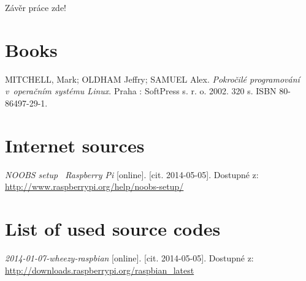 \documentclass[a4paper, twoside, 12pt]{report}
\begin{document}
Závěr práce zde!



\newpage

\fancyhead{}
\fancyhead[RO,LE]{\leftmark}
\begin{thebibliography}{}
\thispagestyle{fancy}


\section*{Books}

  	MITCHELL, Mark; OLDHAM Jeffry; SAMUEL Alex. 
  	\emph{Pokročilé programování v~operačním systému Linux}. 
  	Praha : SoftPress s. r. o. 
  	2002. 
  	320 s.
  	ISBN 80-86497-29-1.
	
	

\section*{Internet sources}

	\emph{NOOBS setup \textbar~Raspberry Pi} [online]. 
	[cit. 2014-05-05]. 
	Dostupné z: \url{http://www.raspberrypi.org/help/noobs-setup/}	
	

\section*{List of used source codes}

	\emph{2014-01-07-wheezy-raspbian} [online].
	[cit. 2014-05-05].
  	Dostupné z: \url{http://downloads.raspberrypi.org/raspbian_latest}

\end{thebibliography}


\appendix

\end{document}
